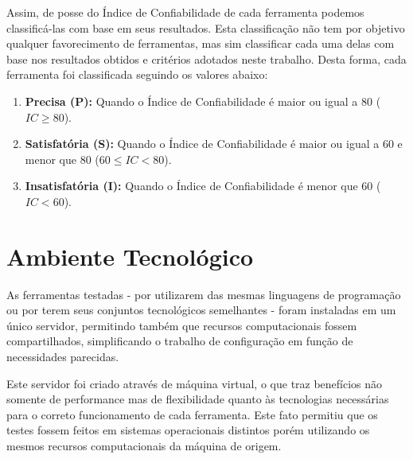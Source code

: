 Assim, de posse do Índice de Confiabilidade de cada ferramenta podemos classificá-las com base em seus resultados. Esta classificação não tem por objetivo qualquer favorecimento de ferramentas, mas sim classificar cada uma delas com base nos resultados obtidos e critérios adotados neste trabalho. Desta forma, cada ferramenta foi classificada seguindo os valores abaixo:

\begin{enumerate}
    \item \textbf{Precisa (P):} Quando o Índice de Confiabilidade é maior ou igual a 80 ($IC\geq80$).
    \item \textbf{Satisfatória (S):} Quando o Índice de Confiabilidade é maior ou igual a 60 e menor que 80 ($60 \leq IC < 80$).
    \item \textbf{Insatisfatória (I):} Quando o Índice de Confiabilidade é menor que 60 ($IC < 60$).
\end{enumerate}

\section{Ambiente Tecnológico}
\label{sec:tech-environment}

As ferramentas testadas - por utilizarem das mesmas linguagens de programação ou por terem seus conjuntos tecnológicos semelhantes - foram instaladas em um único servidor, permitindo também que recursos computacionais fossem compartilhados, simplificando o trabalho de configuração em função de necessidades parecidas.

Este servidor foi criado através de máquina virtual, o que traz benefícios não somente de performance mas de flexibilidade quanto às tecnologias necessárias para o correto funcionamento de cada ferramenta. Este fato permitiu que os testes fossem feitos em sistemas operacionais distintos porém utilizando os mesmos recursos computacionais da máquina de origem.


